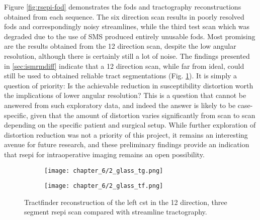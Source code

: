 Figure \ref{fig:rsepi-fod} demonstrates the \glspl{fod} and tractography reconstructions obtained from each sequence.
The six direction scan results in poorly resolved \glspl{fod} and correspondingly noisy streamlines, while the third test scan which was degraded due to the use of SMS produced entirely unusable \glspl{fod}.
Most promising are the results obtained from the 12 direction scan, despite the low angular resolution, although there is certainly still a lot of noise.
The findings presented in \ref{sec:ismrmdiff} indicate that a 12 direction scan, while far from ideal, could still be used to obtained reliable tract segmentations (Fig. \ref{fig:ssepi2}).
It is simply a question of priority:
Is the achievable reduction in susceptibility distortion worth the implications of lower angular resolution?
This is a question that cannot be answered from such exploratory data, and indeed the answer is likely to be case-specific, given that the amount of distortion varies significantly from scan to scan depending on the specific patient and surgical setup.
While further exploration of distortion reduction was not a priority of this project, it remains an interesting avenue for future research, and these preliminary findings provide an indication that \gls{rsepi} for intraoperative imaging remains an open possibility.

\begin{figure}
  \centering
  \begin{subfigure}{0.4\textwidth}
    \texttt{[image: chapter\_6/2\_glass\_tg.png]}
  \end{subfigure}%
  \begin{subfigure}{0.4\textwidth}
    \texttt{[image: chapter\_6/2\_glass\_tf.png]}
  \end{subfigure}
  \caption{Tractfinder reconstruction of the left \gls{cst} in the 12 direction, three segment \gls{rsepi} scan compared with streamline tractography.}
  \label{fig:ssepi2}
\end{figure}
